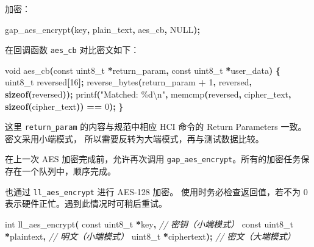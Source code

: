 \documentclass[
  12pt,
]{book}
\newenvironment{Shaded}{\begin{snugshade}}{\end{snugshade}}
\newcommand{\CommentTok}[1]{\textcolor[rgb]{0.56,0.35,0.01}{\textit{#1}}}
\newcommand{\DataTypeTok}[1]{\textcolor[rgb]{0.13,0.29,0.53}{#1}}
\newcommand{\DecValTok}[1]{\textcolor[rgb]{0.00,0.00,0.81}{#1}}
\newcommand{\KeywordTok}[1]{\textcolor[rgb]{0.13,0.29,0.53}{\textbf{#1}}}
\newcommand{\NormalTok}[1]{#1}
\newcommand{\OperatorTok}[1]{\textcolor[rgb]{0.81,0.36,0.00}{\textbf{#1}}}
\newcommand{\SpecialCharTok}[1]{\textcolor[rgb]{0.00,0.00,0.00}{#1}}
\newcommand{\StringTok}[1]{\textcolor[rgb]{0.31,0.60,0.02}{#1}}
\begin{document}
加密：

\begin{Shaded}
\begin{Highlighting}[]
\NormalTok{gap\_aes\_encrypt}\OperatorTok{(}\NormalTok{key}\OperatorTok{,}\NormalTok{ plain\_text}\OperatorTok{,}\NormalTok{ aes\_cb}\OperatorTok{,}\NormalTok{ NULL}\OperatorTok{);}
\end{Highlighting}
\end{Shaded}

在回调函数 \texttt{aes\_cb} 对比密文如下：

\begin{Shaded}
\begin{Highlighting}[]
\DataTypeTok{void}\NormalTok{ aes\_cb}\OperatorTok{(}\DataTypeTok{const} \DataTypeTok{uint8\_t} \OperatorTok{*}\NormalTok{return\_param}\OperatorTok{,} \DataTypeTok{const} \DataTypeTok{uint8\_t} \OperatorTok{*}\NormalTok{user\_data}\OperatorTok{)}
\OperatorTok{\{}
    \DataTypeTok{uint8\_t}\NormalTok{ reversed}\OperatorTok{[}\DecValTok{16}\OperatorTok{];}
\NormalTok{    reverse\_bytes}\OperatorTok{(}\NormalTok{return\_param }\OperatorTok{+} \DecValTok{1}\OperatorTok{,}\NormalTok{ reversed}\OperatorTok{,} \KeywordTok{sizeof}\OperatorTok{(}\NormalTok{reversed}\OperatorTok{));}
\NormalTok{    printf}\OperatorTok{(}\StringTok{"Matched: \%d}\SpecialCharTok{\textbackslash{}n}\StringTok{"}\OperatorTok{,}
\NormalTok{      memcmp}\OperatorTok{(}\NormalTok{reversed}\OperatorTok{,}\NormalTok{ cipher\_text}\OperatorTok{,} \KeywordTok{sizeof}\OperatorTok{(}\NormalTok{cipher\_text}\OperatorTok{))} \OperatorTok{==} \DecValTok{0}\OperatorTok{);}
\OperatorTok{\}}
\end{Highlighting}
\end{Shaded}

这里 \texttt{return\_param} 的内容与规范中相应 HCI 命令的 Return Parameters 一致。密文采用小端模式，
所以需要反转为大端模式，再与测试数据比较。

在上一次 AES 加密完成前，允许再次调用 \texttt{gap\_aes\_encrypt}。所有的加密任务保存在一个队列中，顺序完成。

也通过 \texttt{ll\_aes\_encrypt} 进行 AES-128 加密。
使用时务必检查返回值，若不为 0 表示硬件正忙。遇到此情况时可稍后重试。

\begin{Shaded}
\begin{Highlighting}[]
\DataTypeTok{int}\NormalTok{ ll\_aes\_encrypt}\OperatorTok{(}
  \DataTypeTok{const} \DataTypeTok{uint8\_t} \OperatorTok{*}\NormalTok{key}\OperatorTok{,}       \CommentTok{// 密钥（小端模式）}
  \DataTypeTok{const} \DataTypeTok{uint8\_t} \OperatorTok{*}\NormalTok{plaintext}\OperatorTok{,} \CommentTok{// 明文（小端模式）}
  \DataTypeTok{uint8\_t} \OperatorTok{*}\NormalTok{ciphertext}\OperatorTok{);}     \CommentTok{// 密文（大端模式）}
\end{Highlighting}
\end{Shaded}
\end{document}
